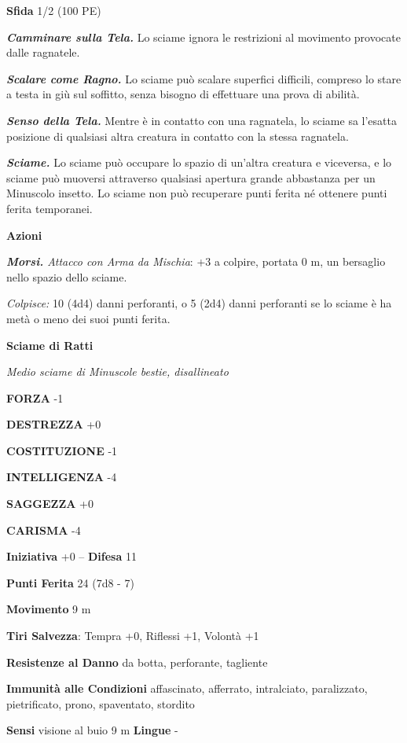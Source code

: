 \begin{multicols}{2}
\textbf{Sfida} 1/2 (100 PE)

\emph{\textbf{Camminare sulla Tela.}} Lo sciame ignora le restrizioni al movimento provocate dalle ragnatele.

\emph{\textbf{Scalare come Ragno.}} Lo sciame può scalare superfici difficili, compreso lo stare a testa in giù sul soffitto, senza bisogno di effettuare una prova di abilità.

\emph{\textbf{Senso della Tela.}} Mentre è in contatto con una ragnatela, lo sciame sa l'esatta posizione di qualsiasi altra creatura in contatto con la stessa ragnatela.

\emph{\textbf{Sciame.}} Lo sciame può occupare lo spazio di un'altra creatura e viceversa, e lo sciame può muoversi attraverso qualsiasi apertura grande abbastanza per un Minuscolo insetto. Lo sciame non può recuperare punti ferita né ottenere punti ferita temporanei.

\textbf{Azioni}

\emph{\textbf{Morsi.} Attacco con Arma da Mischia}: +3 a colpire, portata 0 m, un bersaglio nello spazio dello sciame.

\emph{Colpisce:} 10 (4d4) danni perforanti, o 5 (2d4) danni perforanti se lo sciame è ha metà o meno dei suoi punti ferita.

\medskip\textbf{Sciame di Ratti}

\emph{Medio sciame di Minuscole bestie, disallineato}

\textbf{FORZA} -1

\textbf{DESTREZZA} +0

\textbf{COSTITUZIONE} -1

\textbf{INTELLIGENZA} -4

\textbf{SAGGEZZA} +0

\textbf{CARISMA} -4

\textbf{Iniziativa} +0 -- \textbf{Difesa} 11

\textbf{Punti Ferita} 24 (7d8 - 7)

\textbf{Movimento} 9 m

\textbf{Tiri Salvezza}: Tempra +0, Riflessi +1, Volontà +1

\textbf{Resistenze al Danno} da botta, perforante, tagliente

\textbf{Immunità alle Condizioni} affascinato, afferrato, intralciato, paralizzato, pietrificato, prono, spaventato, stordito

\textbf{Sensi} visione al buio 9 m
\textbf{Lingue} -


\end{multicols}
